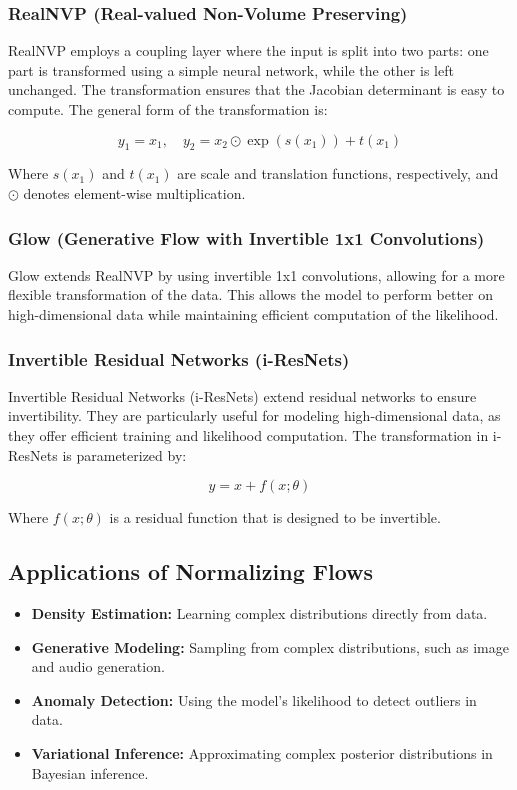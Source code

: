 \documentclass{article}
\begin{document}
\subsubsection{RealNVP (Real-valued Non-Volume Preserving)}
RealNVP employs a coupling layer where the input is split into two parts: one part is transformed using a simple neural network, while the other is left unchanged. The transformation ensures that the Jacobian determinant is easy to compute. The general form of the transformation is:

\[
y_1 = x_1, \quad y_2 = x_2 \odot \exp(s(x_1)) + t(x_1)
\]

Where \( s(x_1) \) and \( t(x_1) \) are scale and translation functions, respectively, and \( \odot \) denotes element-wise multiplication.

\subsubsection{Glow (Generative Flow with Invertible 1x1 Convolutions)}
Glow extends RealNVP by using invertible 1x1 convolutions, allowing for a more flexible transformation of the data. This allows the model to perform better on high-dimensional data while maintaining efficient computation of the likelihood.

\subsubsection{Invertible Residual Networks (i-ResNets)}
Invertible Residual Networks (i-ResNets) extend residual networks to ensure invertibility. They are particularly useful for modeling high-dimensional data, as they offer efficient training and likelihood computation. The transformation in i-ResNets is parameterized by:

\[
y = x + f(x; \theta)
\]

Where \( f(x; \theta) \) is a residual function that is designed to be invertible.

\subsection{Applications of Normalizing Flows}

\begin{itemize}
    \item \textbf{Density Estimation:} Learning complex distributions directly from data.
    \item \textbf{Generative Modeling:} Sampling from complex distributions, such as image and audio generation.
    \item \textbf{Anomaly Detection:} Using the model's likelihood to detect outliers in data.
    \item \textbf{Variational Inference:} Approximating complex posterior distributions in Bayesian inference.
\end{itemize}
\end{document}

